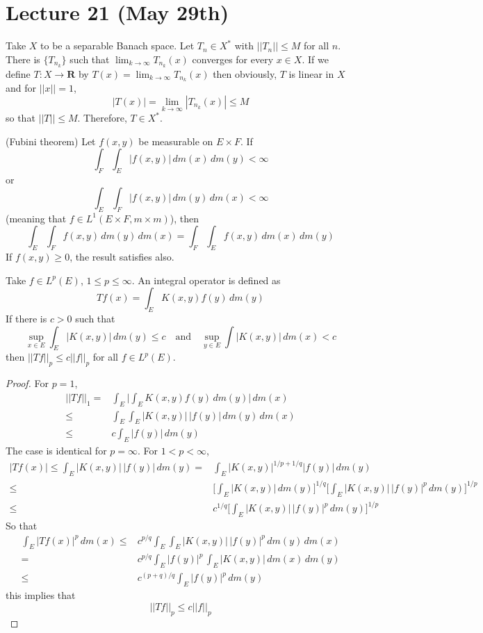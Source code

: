 \section{Lecture 21 (May 29th)}
\begin{thm}
Take $X$ to be a separable Banach space. Let $T_{n}\in X^{*}$ with $||T_{n}||\leq M$ for all $n$. There is $\{T_{n_{k}}\}$ such that $\lim _{k\rightarrow \infty }T_{n_{k}}(x)$ converges for every $x\in X$. If we define $T:X\rightarrow {\bm R}$ by $T(x)=\lim _{k\rightarrow \infty }T_{n_{k}}(x)$ then obviously, $T$ is linear in $X$ and for $||x||=1$,
\[|T(x)|=\lim _{k\rightarrow \infty }|T_{n_{k}}(x)|\leq M\]
so that $||T||\leq M$. Therefore, $T\in X^{*}$.
\end{thm}
\vspace{2ex}
\begin{thm}
(Fubini theorem) Let $f(x,y)$ be measurable on $E\times F$. If 
\[\int _{F}\int _{E}|f(x,y)|\,dm(x)\,dm(y)<\infty \]
or 
\[\int _{E}\int _{F}|f(x,y)|\,d m(y)\,d m(x)<\infty \]
(meaning that $f\in L^{1}(E\times F,m\times m)$), then
\[\int _{E}\int _{F}f(x,y)\,dm(y)\,d m(x)=\int _{F}\int _{E}f(x,y)\,d m(x)\,dm(y)\]
If $f(x,y)\geq 0$, the result satisfies also.
\end{thm}
\vspace{2ex}
\begin{thm}
Take $f\in L^{p}(E)$, $1\leq p\leq\infty $. An integral operator is defined as
\[Tf(x)=\int _{E}K(x,y)f(y)\,d m(y)\]
If there is $c>0$ such that 
\[\sup_{x\in E}\int _{E}|K(x,y)|\,d m(y)\leq c\quad \mathrm{and}\quad \sup_{y\in E}\int |K(x,y)|\,d m(x)<c\]
then $||Tf||_{p}\leq c||f||_{p}$ for all $f\in L^{p}(E)$. 
\end{thm}
\vspace{2ex}
\begin{proof}
For $p=1$, 
\begin{align*}
||Tf||_{1}=&\int _{E}\Big|\int _{E}K(x,y)f(y)\,d m(y)\Big|\,d m(x)\\
\leq &\int _{E}\int _{E}|K(x,y)|\,|f(y)|\,d m(y)\,dm(x)\\
\leq &c\int_E |f(y)|\,d m(y)
\end{align*}
The case is identical for $p=\infty $. For $1<p<\infty $,
\begin{align*}
|Tf(x)|\leq \int _{E}|K(x,y)|\,|f(y)|\,d m(y)=&\int _{E}|K(x,y)|^{1/p+1/q}|f(y)|\,d m(y)\\
\leq &\Big[\int _{E}|K(x,y)|\,d m(y)\Big]^{1/q}\Big[\int _{E}|K(x,y)|\,|f(y)|^{p}\,d m(y)\Big]^{1/p}\\
\leq& c^{1/q}\Big[\int _{E}|K(x,y)|\,|f(y)|^{p}\,d m(y)\Big]^{1/p}
\end{align*}
So that
\begin{align*}
\int _{E}|Tf(x)|^{p}\,d m(x)\leq & c^{p/q}\int _{E}\int _{E}|K(x,y)|\,|f(y)|^{p}\,d m(y)\,d m(x)\\
=&c^{p/q}\int _{E}|f(y)|^{p}\,\int _{E}|K(x,y)|\,d m(x)\,d m(y)\\
\leq & c^{(p+q)/q}\int _{E}|f(y)|^{p}\,d m(y)
\end{align*}
this implies that
\[||Tf||_{p}\leq c||f||_{p}\]
\end{proof}
